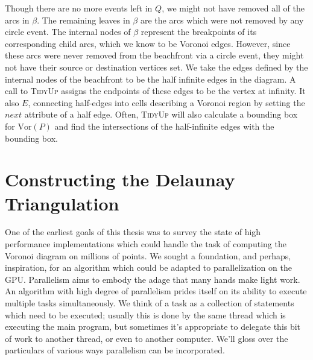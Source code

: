 \documentclass[12pt,twoside]{reedthesis}
\begin{document}
    Though there are no more events left in $Q$, we might not have removed all of the arcs in $\beta$. The remaining leaves in $\beta$ are the arcs which were not removed by any circle event. The internal nodes of $\beta$ represent the breakpoints of its corresponding child arcs, which we know to be Voronoi edges. However, since these arcs were never removed from the beachfront via a circle event, they might not have their source or destination vertices set. We take the edges defined by the internal nodes of the beachfront to be the half infinite edges in the diagram. A call to \textsc{TidyUp} assigns the endpoints of these edges to be the vertex at infinity. It also  $E$, connecting half-edges into cells describing a Voronoi region by setting the $next$ attribute of a half edge. Often, \textsc{TidyUp} will also calculate a bounding box for $\mbox{Vor}(P)$ and find the intersections of the half-infinite edges with the bounding box. 


  \clearpage

  \chapter*{Constructing the Delaunay Triangulation}
    \setcounter{chapter}{3}
    \setcounter{section}{0}

    One of the earliest goals of this thesis was to survey the state of high performance implementations which could handle the task of computing the Voronoi diagram on millions of points. We sought a foundation, and perhaps, inspiration, for an algorithm which could be adapted to parallelization on the GPU. Parallelism aims to embody the adage that many hands make light work. An algorithm with high degree of parallelism prides itself on its ability to execute multiple tasks simultaneously. We think of a task as a collection of statements which need to be executed; usually this is done by the same thread which is executing the main program, but sometimes it's appropriate to delegate this bit of work to another thread, or even to another computer. We'll gloss over the particulars of various ways parallelism can be incorporated. \par
\end{document}
